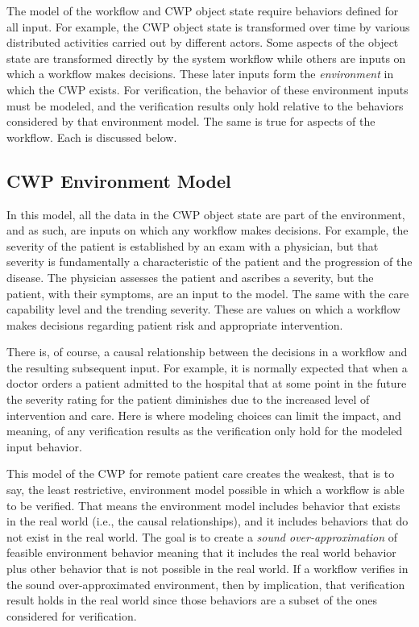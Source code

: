 The model of the workflow and CWP object state require behaviors defined for all input. For example, the CWP object state is transformed over time by various distributed activities carried out by different actors. Some aspects of the object state are transformed directly by the system workflow while others are inputs on which a workflow makes decisions. These later inputs form the \emph{environment} in which the CWP exists. For verification, the behavior of these environment inputs must be modeled, and the verification results only hold relative to the behaviors considered by that environment model. The same is true for aspects of the workflow. Each is discussed below.

\subsection{CWP Environment Model}
In this model, all the data in the CWP object state are part of the environment, and as such, are inputs on which any workflow makes decisions. For example, the severity of the patient is established by an exam with a physician, but that severity is fundamentally a characteristic of the patient and the progression of the disease. The physician assesses the patient and ascribes a severity, but the patient, with their symptoms, are an input to the model. The same with the care capability level and the trending severity. These are values on which a workflow makes decisions regarding patient risk and appropriate intervention. 

There is, of course, a causal relationship between the decisions in a workflow and the resulting subsequent input. For example, it is normally expected that when a doctor orders a patient admitted to the hospital that at some point in the future the severity rating for the patient diminishes due to the increased level of intervention and care. Here is where modeling choices can limit the impact, and meaning, of any verification results as the verification only hold for the modeled input behavior.

This model of the CWP for remote patient care creates the weakest, that is to say, the least restrictive, environment model possible in which a workflow is able to be verified. That means the environment model includes behavior that exists in the real world (i.e., the causal relationships), and it includes behaviors that do not exist in the real world. The goal is to create a \emph{sound over-approximation} of feasible environment behavior meaning that it includes the real world behavior plus other behavior that is not possible in the real world. If a workflow verifies in the sound over-approximated environment, then by implication, that verification result holds in the real world since those behaviors are a subset of the ones considered for verification. 

